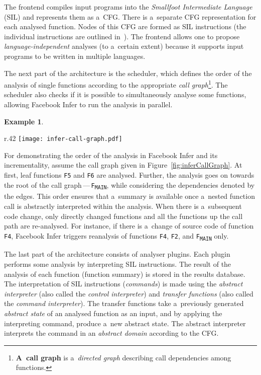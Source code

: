\documentclass{ExcelAtFIT}
\theoremstyle{example}
\newtheorem{example}{Example}[section]
\begin{document}
The frontend compiles input programs into the \emph{Smallfoot Intermediate Language} (SIL) and represents them as a~CFG. There is a~separate CFG representation for each analysed function. Nodes of this CFG are formed as SIL instructions (the individual instructions are outlined in~\cite{harmimBP}). The frontend allows one to propose \emph{language-independent} analyses (to a~certain extent) because it supports input programs to be written in multiple languages.

The next part of the architecture is the scheduler, which defines the order of the analysis of single functions according to the appropriate \emph{call graph}\footnote{\textbf{A~call graph} is a~\emph{directed graph} describing call dependencies among functions.}. The scheduler also checks if it is possible to simultaneously analyse some functions, allowing Facebook Infer to run the analysis in parallel.

\clearpage

\begin{example}
    \label{ex:inferAnalysis}
\end{example}
\vspace{-.3em}
\noindent
\begin{wrapfigure}{r}{.42 \linewidth}
    \centering
    \vspace{-1em}
    \texttt{[image: infer-call-graph.pdf]}
    \label{fig:inferCallGraph}
\end{wrapfigure}
For demonstrating the order of the analysis in Facebook Infer and its incrementality, assume the call graph given in Figure~\ref{fig:inferCallGraph}. At first, leaf functions \texttt{F5} and \texttt{F6} are analysed. Further, the analysis goes on towards the root of the call graph\,---\,\texttt{F\textsubscript{MAIN}}, while considering the dependencies denoted by the edges. This order ensures that a~summary is available once a~nested function call is abstractly interpreted within the analysis. When there is a~subsequent code change, only directly changed functions and all the functions up the call path are re-analysed. For instance, if there is a~change of source code of function \texttt{F4}, Facebook Infer triggers reanalysis of functions \texttt{F4}, \texttt{F2}, and \texttt{F\textsubscript{MAIN}} only.

The last part of the architecture consists of analyser plugins. Each plugin performs some analysis by interpreting SIL instructions. The result of the analysis of each function (function summary) is stored in the results database. The interpretation of SIL instructions (\emph{commands}) is made using the \emph{abstract interpreter} (also called the \emph{control interpreter}) and \emph{transfer functions} (also called the \emph{command interpreter}). The transfer functions take a~previously generated \emph{abstract state} of an analysed function as an input, and by applying the interpreting command, produce a~new abstract state. The abstract interpreter interprets the command in an \emph{abstract domain} according to the CFG.
\end{document}
